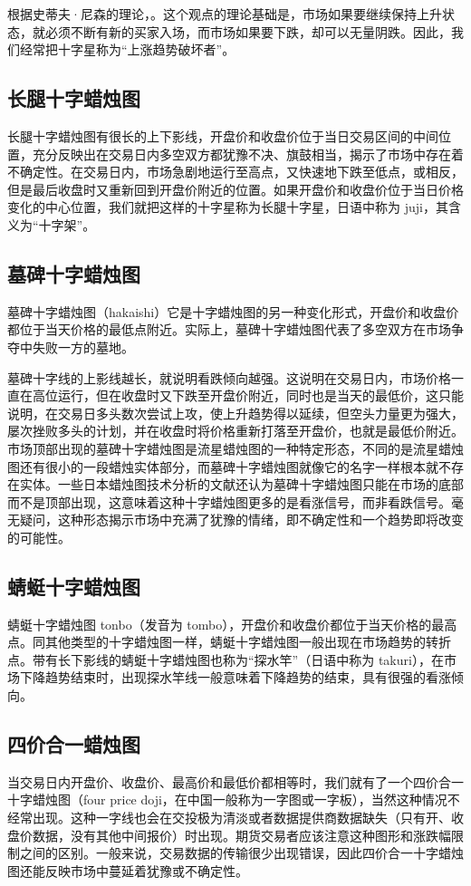 根据史蒂夫·尼森的理论，。这个观点的理论基础是，市场如果要继续保持上升状态，就必须不断有新的买家入场，而市场如果要下跌，却可以无量阴跌。因此，我们经常把十字星称为“上涨趋势破坏者”。
\subsection*{长腿十字蜡烛图}
长腿十字蜡烛图有很长的上下影线，开盘价和收盘价位于当日交易区间的中间位置，充分反映出在交易日内多空双方都犹豫不决、旗鼓相当，揭示了市场中存在着不确定性。在交易日内，市场急剧地运行至高点，又快速地下跌至低点，或相反，但是最后收盘时又重新回到开盘价附近的位置。如果开盘价和收盘价位于当日价格变化的中心位置，我们就把这样的十字星称为长腿十字星，日语中称为 juji，其含义为“十字架”。
\subsection*{墓碑十字蜡烛图}
墓碑十字蜡烛图（hakaishi）它是十字蜡烛图的另一种变化形式，开盘价和收盘价都位于当天价格的最低点附近。实际上，墓碑十字蜡烛图代表了多空双方在市场争夺中失败一方的墓地。

墓碑十字线的上影线越长，就说明看跌倾向越强。这说明在交易日内，市场价格一直在高位运行，但在收盘时又下跌至开盘价附近，同时也是当天的最低价，这只能说明，在交易日多头数次尝试上攻，使上升趋势得以延续，但空头力量更为强大，屡次挫败多头的计划，并在收盘时将价格重新打落至开盘价，也就是最低价附近。市场顶部出现的墓碑十字蜡烛图是流星蜡烛图的一种特定形态，不同的是流星蜡烛图还有很小的一段蜡烛实体部分，而墓碑十字蜡烛图就像它的名字一样根本就不存在实体。一些日本蜡烛图技术分析的文献还认为墓碑十字蜡烛图只能在市场的底部而不是顶部出现，这意味着这种十字蜡烛图更多的是看涨信号，而非看跌信号。毫无疑问，这种形态揭示市场中充满了犹豫的情绪，即不确定性和一个趋势即将改变的可能性。
\subsection*{蜻蜓十字蜡烛图}
蜻蜓十字蜡烛图 tonbo（发音为 tombo），开盘价和收盘价都位于当天价格的最高点。同其他类型的十字蜡烛图一样，蜻蜓十字蜡烛图一般出现在市场趋势的转折点。带有长下影线的蜻蜓十字蜡烛图也称为“探水竿”（日语中称为 takuri），在市场下降趋势结束时，出现探水竿线一般意味着下降趋势的结束，具有很强的看涨倾向。
\subsection*{四价合一蜡烛图}
当交易日内开盘价、收盘价、最高价和最低价都相等时，我们就有了一个四价合一十字蜡烛图（four price doji，在中国一般称为一字图或一字板），当然这种情况不经常出现。这种一字线也会在交投极为清淡或者数据提供商数据缺失（只有开、收盘价数据，没有其他中间报价）时出现。期货交易者应该注意这种图形和涨跌幅限制之间的区别。一般来说，交易数据的传输很少出现错误，因此四价合一十字蜡烛图还能反映市场中蔓延着犹豫或不确定性。
